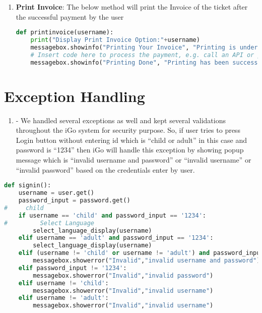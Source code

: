 \documentclass[a4paper,12pt]{report}
\newcommand{\asection}[2]{
\setcounter{section}{#1}
\addtocounter{section}{-1}
\section{#2}
}
\begin{document}
\begin{enumerate}
\begin{lstlisting}[language=Python]
    print("Display Payment Option:"+username)
    root.img = PhotoImage(file='login.png')
    Label(root,image=img,bg='white').place(x=50,y=50)
    frame = Frame(root,width=400,height=550,bg="white")
    frame.place(x=440,y=70)
    heading = Label(frame, text='Payment Options', fg='#57a1f8',bg='white',font=('Microsoft YaHei UI Light',23,'bold'))
    heading.place(x=100,y=5)
    Button(frame,width=25,pady=7,text="Credit/Debit Card",bg='#ff8c00',fg='#57a1f8',font=('Microsoft YaHei UI Light',15,'bold','italic'),border=0,highlightbackground="#ff8c00",command=lambda: creditdebit(username)).place(x=40,y=107)
    Button(frame,width=25,pady=7,text="Cash",bg='#ff8c00',fg='#57a1f8',font=('Microsoft YaHei UI Light',15,'bold','italic'),border=0,highlightbackground="#ff8c00").place(x=40,y=170)
\end{lstlisting}
\item \textbf{Print Invoice}: The below method will print the Invoice of the ticket after the successful payment by the user\\
\begin{lstlisting}[language=Python]
def printinvoice(username):
    print("Display Print Invoice Option:"+username)
    messagebox.showinfo("Printing Your Invoice", "Printing is under process!!")
    # Insert code here to process the payment, e.g. call an API or perform necessary actions
    messagebox.showinfo("Printing Done", "Printing has been successfully completed!")
\end{lstlisting}
\end{enumerate}
\newpage
\asection{2}{Exception Handling}
\begin{enumerate}
    \item -	We handled several exceptions as well and kept several validations throughout the iGo system for security purpose. So, if user tries to press Login button without entering id which is “child or adult” in this case and password is “1234” then iGo will handle this exception by showing popup message which is “invalid username and password” or “invalid username” or “invalid password” based on the credentials enter by user.\\
\end{enumerate}
\begin{lstlisting}[language=Python]
def signin():
    username = user.get()
    password_input = password.get()
#     child
    if username == 'child' and password_input == '1234':
#         Select Language
        select_language_display(username)
    elif username == 'adult' and password_input == '1234':
        select_language_display(username)
    elif (username != 'child' or username != 'adult') and password_input != '1234': 
        messagebox.showerror("Invalid","invalid username and password")
    elif password_input != '1234': 
        messagebox.showerror("Invalid","invalid password")
    elif username != 'child': 
        messagebox.showerror("Invalid","invalid username") 
    elif username != 'adult': 
        messagebox.showerror("Invalid","invalid username") 
\end{lstlisting}
\end{document}
